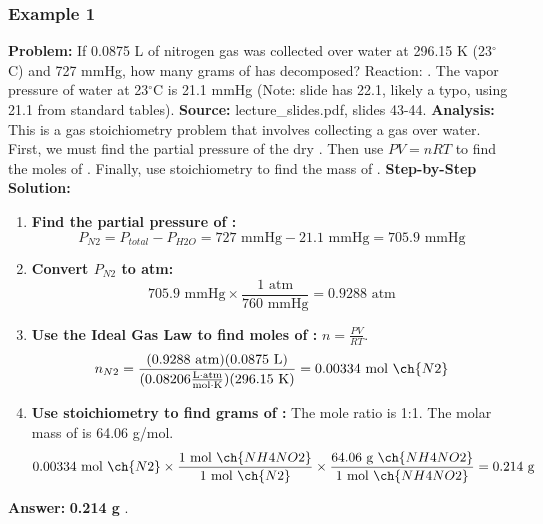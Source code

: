 \documentclass{article}
\begin{document}
\subsubsection{Example 1}
\textbf{Problem:} If 0.0875 L of nitrogen gas was collected over water at 296.15 K (23$^\circ$C) and 727 mmHg, how many grams of  has decomposed? Reaction: . The vapor pressure of water at 23$^\circ$C is 21.1 mmHg (Note: slide has 22.1, likely a typo, using 21.1 from standard tables).
\textbf{Source:} lecture\_slides.pdf, slides 43-44.
\textbf{Analysis:} This is a gas stoichiometry problem that involves collecting a gas over water. First, we must find the partial pressure of the dry . Then use $PV=nRT$ to find the moles of . Finally, use stoichiometry to find the mass of .
\textbf{Step-by-Step Solution:}
\begin{enumerate}
    \item \textbf{Find the partial pressure of :}
    \[ P_{N2} = P_{total} - P_{H2O} = 727 \text{ mmHg} - 21.1 \text{ mmHg} = 705.9 \text{ mmHg} \]
    \item \textbf{Convert $P_{N2}$ to atm:}
    \[ 705.9 \text{ mmHg} \times \frac{1 \text{ atm}}{760 \text{ mmHg}} = 0.9288 \text{ atm} \]
    \item \textbf{Use the Ideal Gas Law to find moles of :} $n = \frac{PV}{RT}$.
    \[ n_{N2} = \frac{(0.9288 \text{ atm})(0.0875 \text{ L})}{(0.08206 \frac{\text{L}\cdot\text{atm}}{\text{mol}\cdot\text{K}})(296.15 \text{ K})} = 0.00334 \text{ mol } \ch{N2} \]
    \item \textbf{Use stoichiometry to find grams of :} The mole ratio is 1:1. The molar mass of  is 64.06 g/mol.
    \[ 0.00334 \text{ mol } \ch{N2} \times \frac{1 \text{ mol } \ch{NH4NO2}}{1 \text{ mol } \ch{N2}} \times \frac{64.06 \text{ g } \ch{NH4NO2}}{1 \text{ mol } \ch{NH4NO2}} = 0.214 \text{ g} \]
\end{enumerate}
\textbf{Answer:} \textbf{0.214 g }.
\end{document}
